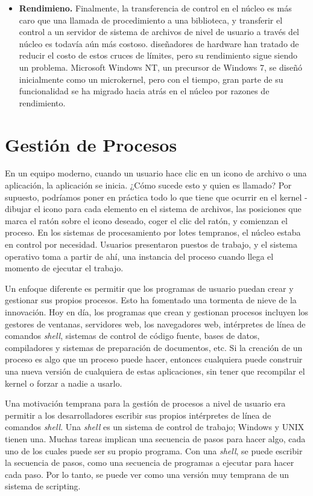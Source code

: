 \documentclass[10pt]{book}
\begin{document}
\begin{itemize}
\item \textbf{Rendimieno.} Finalmente, la transferencia de control en el núcleo es más caro que una llamada de procedimiento a una biblioteca, y transferir el control a un servidor de sistema de archivos de nivel de usuario a través del núcleo es todavía aún más costoso. diseñadores de hardware han tratado de reducir el costo de estos cruces de límites, pero su rendimiento sigue siendo un problema. Microsoft Windows NT, un precursor de Windows 7, se diseñó inicialmente como un microkernel, pero con el tiempo, gran parte de su funcionalidad se ha migrado hacia atrás en el núcleo por razones de rendimiento.
\end{itemize}

\section{Gestión de Procesos}
En un equipo moderno, cuando un usuario hace clic en un icono de archivo o una aplicación, la aplicación se inicia. ¿Cómo sucede esto y quien es llamado? Por supuesto, podríamos poner en práctica todo lo que tiene que ocurrir en el kernel - dibujar el icono para cada elemento en el sistema de archivos, las posiciones que marca el ratón sobre el icono deseado, coger el clic del ratón, y comienzan el proceso. En los sistemas de procesamiento por lotes tempranos, el núcleo estaba en control por necesidad. Usuarios presentaron puestos de trabajo, y el sistema operativo toma a partir de ahí, una instancia del proceso cuando llega el momento de ejecutar el trabajo.

Un enfoque diferente es permitir que los programas de usuario puedan crear y gestionar sus propios procesos. Esto ha fomentado una tormenta de nieve de la innovación. Hoy en día, los programas que crean y gestionan procesos incluyen los gestores de ventanas, servidores web, los navegadores web, intérpretes de línea de comandos \textit{shell}, sistemas de control de código fuente, bases de datos, compiladores y sistemas de preparación de documentos, etc. Si la creación de un proceso es algo que un proceso puede hacer, entonces cualquiera puede construir una nueva versión de cualquiera de estas aplicaciones, sin tener que recompilar el kernel o forzar a nadie a usarlo.

Una motivación temprana para la gestión de procesos a nivel de usuario era permitir a los desarrolladores escribir sus propios intérpretes de línea de comandos \textit{shell}. Una \textit{shell} es un sistema de control de trabajo; Windows y UNIX tienen una. Muchas tareas implican una secuencia de pasos para hacer algo, cada uno de los cuales puede ser su propio programa. Con una \textit{shell}, se puede escribir la secuencia de pasos, como una secuencia de programas a ejecutar para hacer cada paso. Por lo tanto, se puede ver como una versión muy temprana de un sistema de scripting.
\end{document}
